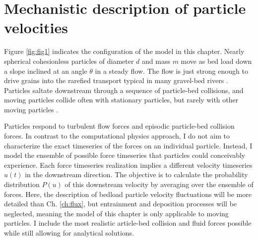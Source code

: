 \section{Mechanistic description of particle velocities}
\label{sec:langmodel}

Figure \ref{fig:fig1} indicates the configuration of the model in this chapter.
Nearly spherical cohesionless particles of diameter $d$ and mass $m$ move as bed load down a slope inclined at an angle $\theta$ in a steady flow.
The flow is just strong enough to drive grains into the rarefied transport typical in many gravel-bed rivers \citep[e.g.][]{Ashworth1989, Warburton1992}. Particles saltate downstream through a sequence of particle-bed collisions, and moving particles collide often with stationary particles, but rarely with other moving particles \citep[cf.][]{Williams2021}.

Particles respond to turbulent flow forces and episodic particle-bed collision forces. In contrast to the computational physics approach, I do not aim to characterize the exact timeseries of the forces on an individual particle. Instead, I model the ensemble of possible force timeseries that particles could conceivably experience. Each force timeseries realization implies a different velocity timeseries $u(t)$ in the downstream direction.
The objective is to calculate the probability distribution $P(u)$ of this downstream velocity by averaging over the ensemble of forces.
Here, the description of bedload particle velocity fluctuations will be more detailed than Ch. \ref{ch:flux}, but entrainment and deposition processes will be neglected, meaning the model of this chapter is only applicable to moving particles.
I include the most realistic article-bed collision and fluid forces possible while still allowing for analytical solutions.

